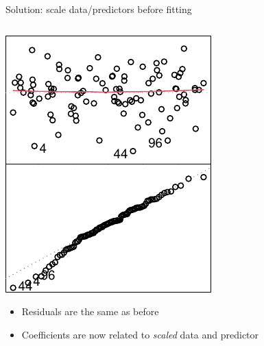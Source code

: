 \documentclass[
  ignorenonframetext,
  aspectratio=169]{beamer}
\providecommand{\tightlist}{%
  \setlength{\itemsep}{0pt}\setlength{\parskip}{0pt}}
\begin{document}
\begin{frame}[fragile]{Solution: scale data/predictors before fitting}
\begin{columns}[T]
\begin{column}{0.48\textwidth}
\includegraphics{03-Lecture_files/figure-beamer/unnamed-chunk-48-1.pdf}

\small

\begin{itemize}[<+->]
\tightlist
\item
  Residuals are the same as before
\item
  Coefficients are now related to \emph{scaled} data and predictor
\end{itemize}
\end{column}
\end{columns}
\end{frame}
\end{document}

